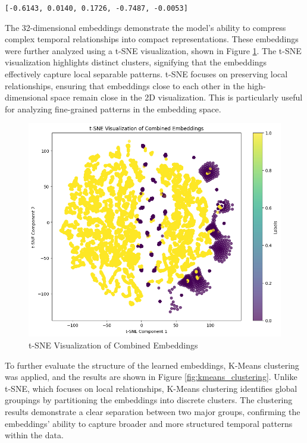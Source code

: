 \documentclass[twocolumn]{article}
\begin{document}
    \begin{center}
        \texttt{[-0.6143, 0.0140, 0.1726, -0.7487, -0.0053]} \\
    \end{center}

    The 32-dimensional embeddings demonstrate the model's ability to compress
    complex temporal relationships into compact representations. These embeddings
    were further analyzed using a t-SNE visualization, shown in Figure
    \ref{fig:tsne_combined}. The t-SNE visualization highlights distinct clusters,
    signifying that the embeddings effectively capture local separable patterns.
    t-SNE focuses on preserving local relationships, ensuring that embeddings
    close to each other in the high-dimensional space remain close in the 2D
    visualization. This is particularly useful for analyzing fine-grained patterns
    in the embedding space.

    \begin{figure}[ht]
        \centering
        \includegraphics[width=1\linewidth]{tsne_combined.png}
        \caption{t-SNE Visualization of Combined Embeddings}
        \label{fig:tsne_combined}
    \end{figure}

    To further evaluate the structure of the learned embeddings, K-Means clustering
    was applied, and the results are shown in Figure \ref{fig:kmeans_clustering}.
    Unlike t-SNE, which focuses on local relationships, K-Means clustering identifies
    global groupings by partitioning the embeddings into discrete clusters. The
    clustering results demonstrate a clear separation between two major groups, confirming
    the embeddings' ability to capture broader and more structured temporal
    patterns within the data.
\end{document}
